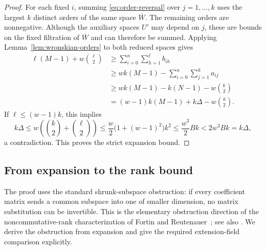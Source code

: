\begin{proof}
For each fixed $i$, summing \eqref{eq:order-reversal} over $j=1,\ldots,k$
uses the largest $k$ distinct orders of the same space $\overline W$.
The remaining orders are nonnegative.  Although the auxiliary spaces
$U'$ may depend on $j$, these are bounds on the fixed filtration of
$\overline W$ and can therefore be summed.  Applying
Lemma~\ref{lem:wronskian-orders} to both reduced spaces gives
\begin{align*}
  \ell(M-1)+w\binom\ell2
  &\geq\sum_{i=0}^n\sum_{h=1}^{\ell}b_{ih}\\
  &\geq wk(M-1)-\sum_{i=0}^n\sum_{j=1}^k a_{ij}\\
  &\geq wk(M-1)-k(N-1)-w\binom k2\\
  &=(w-1)k(M-1)+k\Delta-w\binom k2.
\end{align*}
If $\ell\leq(w-1)k$, this implies
\[
  k\Delta\leq w\left(\binom k2+\binom\ell2\right)
  \leq\frac w2\bigl(1+(w-1)^2\bigr)k^2
  \leq\frac{w^3}{2}Bk
  <2w^3Bk=k\Delta,
\]
a contradiction.  This proves the strict expansion bound.
\end{proof}

\subsection{From expansion to the rank bound}

The proof uses the standard shrunk-subspace obstruction: if every
coefficient matrix sends a common subspace into one of smaller
dimension, no matrix substitution can be invertible.
This is the elementary obstruction direction of the
noncommutative-rank characterization of Fortin and
Reutenauer~\citep[Section~2, Theorem~1]{FR04}; see also
\citet[Definition~1.1 and Section~5.1]{IQS18}.
We derive the obstruction from expansion and give the required
extension-field comparison explicitly.

